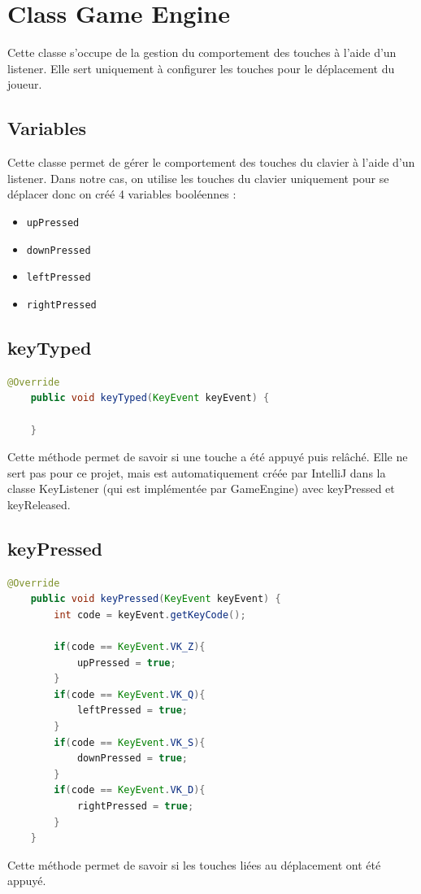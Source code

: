 \documentclass[11pt,a4paper,french]{article}
\begin{document}
\section{Class Game Engine}
Cette classe s'occupe de la gestion du comportement des touches à l'aide d'un listener. Elle sert uniquement à configurer les touches pour le déplacement du joueur. 
\subsection{Variables}
Cette classe permet de gérer le comportement des touches du clavier à l'aide d'un listener. 
Dans notre cas, on utilise les touches du clavier uniquement pour se déplacer donc on créé 4 variables booléennes :
\begin{itemize}
    \item \verb|upPressed| 
    \item \verb|downPressed| 
    \item \verb|leftPressed| 
    \item \verb|rightPressed| 
\end{itemize}

\subsection{keyTyped}
\begin{lstlisting}[language=Java]
    @Override
    public void keyTyped(KeyEvent keyEvent) {

    }
\end{lstlisting}
Cette méthode permet de savoir si une touche a été appuyé puis relâché. Elle ne sert pas pour ce projet, mais est 
automatiquement créée par IntelliJ dans la classe KeyListener (qui est implémentée par GameEngine) avec keyPressed et keyReleased.
\newpage
\subsection{keyPressed}
\begin{lstlisting}[language=Java]
    @Override
    public void keyPressed(KeyEvent keyEvent) {
        int code = keyEvent.getKeyCode();

        if(code == KeyEvent.VK_Z){
            upPressed = true;
        }
        if(code == KeyEvent.VK_Q){
            leftPressed = true;
        }
        if(code == KeyEvent.VK_S){
            downPressed = true;
        }
        if(code == KeyEvent.VK_D){
            rightPressed = true;
        }
    }
\end{lstlisting}
Cette méthode permet de savoir si les touches liées au déplacement ont été appuyé.
\end{document}
